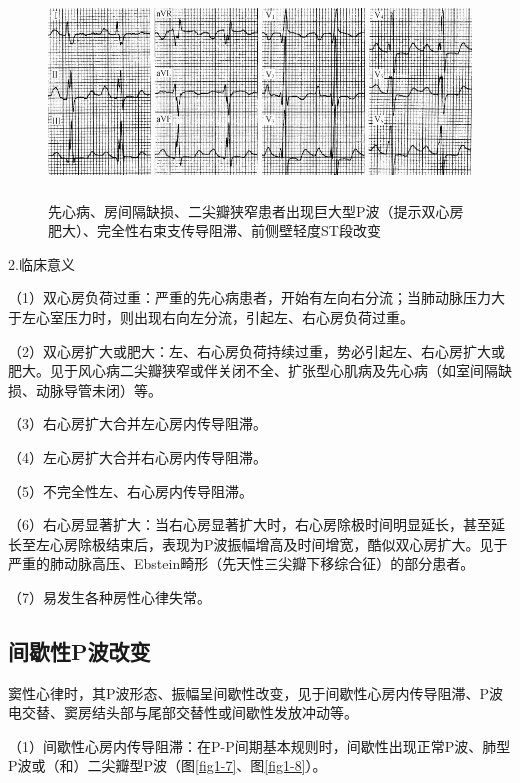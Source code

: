 \begin{figure}[!htbp]
 \centering
 \includegraphics[width=5.58333in,height=2.19792in]{./images/Image00011.jpg}
 \captionsetup{justification=centering}
 \caption{先心病、房间隔缺损、二尖瓣狭窄患者出现巨大型P波（提示双心房肥大）、完全性右束支传导阻滞、前侧壁轻度ST段改变}
 \label{fig1-6}
  \end{figure} 

2.临床意义

（1）双心房负荷过重：严重的先心病患者，开始有左向右分流；当肺动脉压力大于左心室压力时，则出现右向左分流，引起左、右心房负荷过重。

（2）双心房扩大或肥大：左、右心房负荷持续过重，势必引起左、右心房扩大或肥大。见于风心病二尖瓣狭窄或伴关闭不全、扩张型心肌病及先心病（如室间隔缺损、动脉导管未闭）等。

（3）右心房扩大合并左心房内传导阻滞。

（4）左心房扩大合并右心房内传导阻滞。

（5）不完全性左、右心房内传导阻滞。

（6）右心房显著扩大：当右心房显著扩大时，右心房除极时间明显延长，甚至延长至左心房除极结束后，表现为P波振幅增高及时间增宽，酷似双心房扩大。见于严重的肺动脉高压、Ebstein畸形（先天性三尖瓣下移综合征）的部分患者。

（7）易发生各种房性心律失常。

\protect\hypertarget{text00007.htmlux5cux23subid9}{}{}

\subsection{间歇性P波改变}

窦性心律时，其P波形态、振幅呈间歇性改变，见于间歇性心房内传导阻滞、P波电交替、窦房结头部与尾部交替性或间歇性发放冲动等。

（1）间歇性心房内传导阻滞：在P-P间期基本规则时，间歇性出现正常P波、肺型P波或（和）二尖瓣型P波（图\ref{fig1-7}、图\ref{fig1-8}）。

